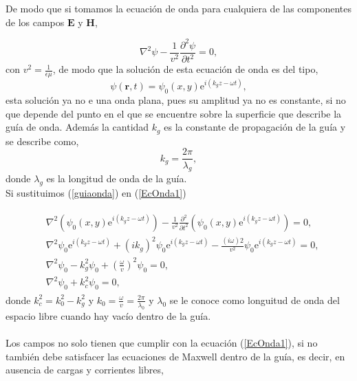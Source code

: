 \documentclass[11pt,fleqn]{book} %
\begin{document}
De modo que si tomamos la ecuaci\'on de onda para cualquiera de las componentes de los campos $\textbf{E}$ y $\textbf{H}$,

\begin{equation} \label{EcOnda1}
\nabla^2 \psi-\frac{1}{v^2}\frac{\partial^2 \psi}{\partial t^2}=0,
\end{equation}
con $v^2=\frac{1}{\epsilon\mu}$, de modo que la soluci\'on de esta ecuaci\'on de onda es del tipo,
\begin{equation} \label{guiaonda}
\psi(\textbf{r},t)=\psi_{0}(x,y)\text{e}^{i(k_{g}z- \omega t)},
\end{equation}
esta soluci\'on ya no e una onda plana, pues su amplitud ya no es constante, si no que depende del punto en el que se encuentre sobre la superficie que describe la gu\'ia de onda. Adem\'as la cantidad $k_{g}$ es la constante de propagaci\'on de la gu\'ia y se describe como,
\begin{equation}
 k_{g}=\frac{2 \pi}{\lambda_{g}},
 \end{equation}
 donde $\lambda_{g}$ es la longitud de onda de la gu\'ia.\\

 Si sustituimos (\ref{guiaonda}) en (\ref{EcOnda1})

\begin{eqnarray*}
 \begin{split}
 & \nabla^2\left( \psi_{0}(x,y)\text{e}^{i(k_{g}z- \omega t)} \right)-\frac{1}{v^2}\frac{\partial^2}{\partial t^2} \left( \psi_{0}(x,y)\text{e}^{i(k_{g}z- \omega t)} \right)=0,\\
 & \nabla^2 \psi_{0}\text{e}^{i(k_{g}z- \omega t)}+(ik_{g})^2 \psi_{0} \text{e}^{i(k_{g}z- \omega t)}-\frac{(i \omega)2}{v^2} \psi_{0} \text{e}^{i(k_{g}z- \omega t)}=0,\\
 & \nabla^2 \psi_{0}-k_{g}^2 \psi_{0} +\left(\frac{\omega}{v}\right)^2 \psi_{0} =0,\\
 & \nabla^2 \psi_{0}+k_{c}^2 \psi_{0}=0,
 \end{split}
 \end{eqnarray*}
 donde $k_c^2=k_0^2-k_g^2$ y $k_0=\frac{\omega}{v}=\frac{2 \pi}{\lambda_0}$ y $\lambda_0$ se le conoce como longuitud de onda del espacio libre cuando hay vac\'io dentro de la gu\'ia. \\\\
 Los campos no solo tienen que cumplir con la ecuaci\'on (\ref{EcOnda1}), si no tambi\'en debe satisfacer las ecuaciones de Maxwell dentro de la gu\'ia, es decir, en ausencia de cargas y corrientes libres,
\end{document}
